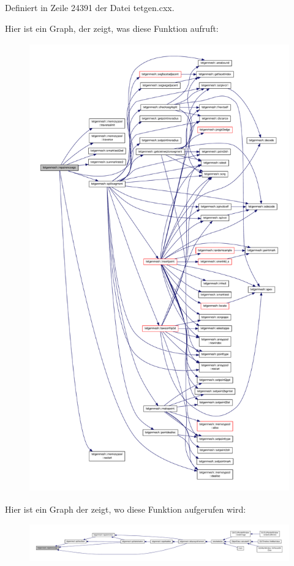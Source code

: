 Definiert in Zeile 24391 der Datei tetgen.\-cxx.



Hier ist ein Graph, der zeigt, was diese Funktion aufruft\-:
\nopagebreak
\begin{figure}[H]
\begin{center}
\leavevmode
\includegraphics[height=550pt]{classtetgenmesh_a7af360f1ae413f9e0d7803ccae55b6d6_cgraph}
\end{center}
\end{figure}




Hier ist ein Graph der zeigt, wo diese Funktion aufgerufen wird\-:
\nopagebreak
\begin{figure}[H]
\begin{center}
\leavevmode
\includegraphics[width=350pt]{classtetgenmesh_a7af360f1ae413f9e0d7803ccae55b6d6_icgraph}
\end{center}
\end{figure}


